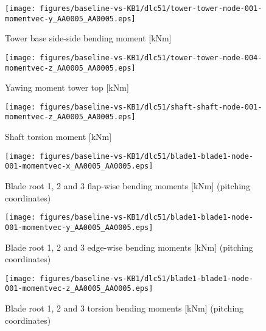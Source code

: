 \begin{figure}[!ht]
\begin{center}
	\texttt{[image: figures/baseline-vs-KB1/dlc51/tower-tower-node-001-momentvec-y\_AA0005\_AA0005.eps]}
\end{center}
\caption{Tower base side-side bending moment [kNm]}
\label{fig:baseline-vs-KB1:dlc51:tower-base-ss}
\end{figure}

\begin{figure}[!ht]
\begin{center}
	\texttt{[image: figures/baseline-vs-KB1/dlc51/tower-tower-node-004-momentvec-z\_AA0005\_AA0005.eps]}
\end{center}
\caption{Yawing moment tower top [kNm]}
\label{fig:baseline-vs-KB1:dlc51:tower-top-yaw}
\end{figure}

\begin{figure}[!ht]
\begin{center}
	\texttt{[image: figures/baseline-vs-KB1/dlc51/shaft-shaft-node-001-momentvec-z\_AA0005\_AA0005.eps]}
\end{center}
\caption{Shaft torsion moment [kNm]}
\label{fig:baseline-vs-KB1:dlc51:shaft-torsion}
\end{figure}

\begin{figure}[!ht]
\begin{center}
	\texttt{[image: figures/baseline-vs-KB1/dlc51/blade1-blade1-node-001-momentvec-x\_AA0005\_AA0005.eps]}
\end{center}
\caption{Blade root 1, 2 and 3 flap-wise bending moments [kNm] (pitching coordinates)}
\label{fig:baseline-vs-KB1:dlc51:blade-root-flap}
\end{figure}

\begin{figure}[!ht]
\begin{center}
	\texttt{[image: figures/baseline-vs-KB1/dlc51/blade1-blade1-node-001-momentvec-y\_AA0005\_AA0005.eps]}
\end{center}
\caption{Blade root 1, 2 and 3 edge-wise bending moments [kNm] (pitching coordinates)}
\label{fig:baseline-vs-KB1:dlc51:blade-root-edge}
\end{figure}

\begin{figure}[!ht]
\begin{center}
	\texttt{[image: figures/baseline-vs-KB1/dlc51/blade1-blade1-node-001-momentvec-z\_AA0005\_AA0005.eps]}
\end{center}
\caption{Blade root 1, 2 and 3 torsion bending moments [kNm] (pitching coordinates)}
\label{fig:baseline-vs-KB1:dlc51:blade-root-torsion}
\end{figure}

